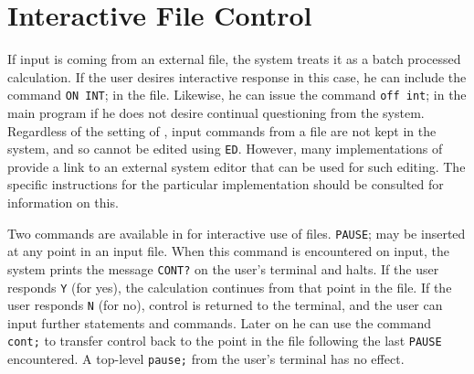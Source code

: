 \section{Interactive File Control}
\hypertarget{switch:INT}{}
If input is coming from an external file, the system treats it as a batch
processed calculation.  If the user desires interactive
 response in this case, he can include the command
\texttt{ON INT}; in the file.  Likewise, he can issue the
command \texttt{off int}; in the main program if he does not desire continual
questioning from the system.  Regardless of the setting of ,
input commands from a file are not kept in the system, and so cannot be
edited using \texttt{ED}.  However, many implementations of {\REDUCE} provide
a link to an external system editor that can be used for such editing.
The specific instructions for the particular implementation should be
consulted for information on this.

\hypertarget{CONT-and-PAUSE}{}
Two commands are available in {\REDUCE} for interactive use of files. 
\texttt{PAUSE}; 
may be inserted at any point in an input file.  
When this command is encountered on input, the system prints the message 
\texttt{CONT?} on the user's terminal and halts.  If the user responds 
\texttt{Y}
(for yes), the calculation continues from that point in the file.  If the
user responds \texttt{N} (for no), control is returned to the terminal, and
the user can input further statements and commands.  Later on he can use
the command \texttt{cont;}  
to transfer control back to the
point in the file following the last \texttt{PAUSE} encountered.  A top-level
\texttt{pause;} from the user's terminal has no effect.

